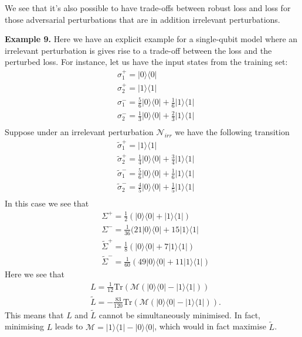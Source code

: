 \documentclass[onecolumn,prx, superscriptaddress,longbibliography,margin=1mm 11pt]{revtex4-2}
\begin{document}
We see that it's also possible to have trade-offs between robust loss and loss for those adversarial perturbations that are in addition irrelevant perturbations. 

\noindent \textbf{Example 9.}
    Here we have an explicit example for a single-qubit model where an irrelevant perturbation is gives rise to a trade-off between the loss and the perturbed loss. For instance, let us have the input states from the training set:
\begin{align}
    &\sigma^+_1=|0\rangle \langle 0| \nonumber \\
    &\sigma^+_2=|1\rangle \langle 1| \nonumber \\
    & \sigma^-_1=\frac{5}{6}|0\rangle \langle 0|+\frac{1}{6}|1\rangle \langle 1| \nonumber \\
    &\sigma^-_2=\frac{1}{3}|0\rangle \langle 0|+\frac{2}{3}|1\rangle \langle 1| \nonumber \\
\end{align}
Suppose under an irrelevant perturbation $\mathcal{N}_{irr}$ we have the following transition
\begin{align}
     &\tilde{\sigma}^+_1=|1\rangle \langle 1| \nonumber \\
    &\tilde{\sigma}^+_2=\frac{1}{4}|0\rangle \langle 0|+\frac{3}{4}|1\rangle \langle 1| \nonumber \\
    & \tilde{\sigma}^-_1=\frac{5}{6}|0\rangle \langle 0|+\frac{1}{6}|1\rangle \langle 1| \nonumber \\
    &\tilde{\sigma}^-_2=\frac{4}{5}|0\rangle \langle 0|+\frac{1}{5}|1\rangle \langle 1| \nonumber \\
\end{align}
In this case we see that 
\begin{align}
    &\Sigma^+=\frac{1}{2}(|0\rangle \langle 0|+|1\rangle \langle 1|) \nonumber \\
    & \Sigma^-=\frac{1}{36}(21|0\rangle \langle 0|+15|1\rangle \langle 1| \nonumber \\
    & \tilde{\Sigma}^+=\frac{1}{8}(|0\rangle \langle 0|+7|1\rangle \langle 1|) \nonumber \\
    & \tilde{\Sigma}^-=\frac{1}{60}(49|0\rangle \langle 0|+11|1\rangle \langle 1|)
\end{align}
Here we see that 
\begin{align}
   & L=\frac{1}{12}\text{Tr}(\mathcal{M}(|0\rangle \langle 0|-|1\rangle \langle 1|)) \nonumber \\
   & \tilde{L}=-\frac{83}{120}\text{Tr}(\mathcal{M}(|0\rangle \langle 0|-|1\rangle \langle 1|)).
\end{align}
This means that $L$ and $\tilde{L}$ cannot be simultaneously minimised. In fact, minimising $L$ leads to $\mathcal{M}=|1\rangle \langle 1|-|0\rangle \langle 0|$, which would in fact maximise $\tilde{L}$. \\
\end{document}
